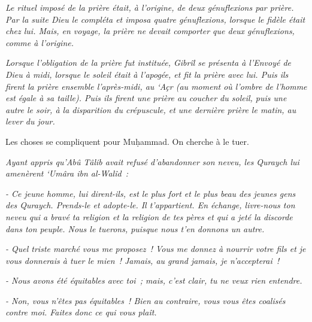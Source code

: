 \emph{Le rituel imposé de la prière était, à l'origine, de deux
génuflexions par prière. Par la suite Dieu le compléta et imposa quatre
génuflexions, lorsque le fidèle était chez lui. Mais, en voyage, la
prière ne devait comporter que deux génuflexions, comme à l'origine.}

\emph{Lorsque l'obligation de la prière fut instituée, Gibrîl se
présenta à l'Envoyé de Dieu à midi, lorsque le soleil était à l'apogée,
et fit la prière avec lui. Puis ils firent la prière ensemble
l'après-midi, au `Açr (au moment où l'ombre de l'homme est égale à sa
taille). Puis ils firent une prière au coucher du soleil, puis une autre
le soir, à la disparition du crépuscule, et une dernière prière le
matin, au lever du jour.}


Les choses se compliquent pour Muḥammad. On cherche à le tuer.

\emph{Ayant appris qu'Abû Tâlib avait refusé d'abandonner son neveu, les
Quraych lui amenèrent `Umâra ibn al-Walîd~:}

\emph{- Ce jeune homme, lui dirent-ils, est le plus fort et le plus beau
des jeunes gens des Quraych. Prends-le et adopte-le. Il t'appartient. En
échange, livre-nous ton neveu qui a bravé ta religion et la religion de
tes pères et qui a jeté la discorde dans ton peuple. Nous le tuerons,
puisque nous t'en donnons un autre.}

\emph{- Quel triste marché vous me proposez~! Vous me donnez à nourrir
votre fils et je vous donnerais à tuer le mien~! Jamais, au grand
jamais, je n'accepterai~!}

\emph{- Nous avons été équitables avec toi~; mais, c'est clair, tu ne
veux rien entendre.}

\emph{- Non, vous n'êtes pas équitables~! Bien au contraire, vous vous
êtes coalisés contre moi. Faites donc ce qui vous plaît.}

